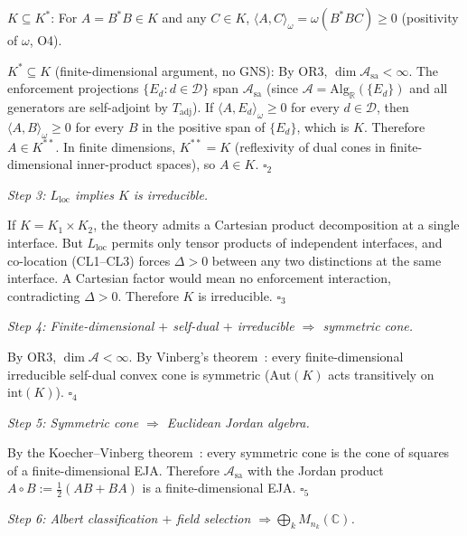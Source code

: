 \documentclass[11pt]{article}
\theoremstyle{remark}
\begin{document}
\begin{tcolorbox}[apfbox, title={Proposition T1-NB (Non-Boolean Bridge): $L_\Delta + L_{\mathrm{loc}} + \mathrm{OR1} + \mathrm{OR2} + \mathrm{OR3} \Rightarrow \mathcal{A} \cong \bigoplus_k M_{n_k}(\mathbb{C})$}]
$K \subseteq K^*$: For $A = B^*B \in K$ and any $C \in K$, $\langle A, C\rangle_\omega = \omega(B^*BC) \ge 0$ (positivity of $\omega$, O4).

$K^* \subseteq K$ (finite-dimensional argument, no GNS): By OR3, $\dim \mathcal{A}_{\mathrm{sa}} < \infty$.  The enforcement projections $\{E_d : d \in \mathcal{D}\}$ span $\mathcal{A}_{\mathrm{sa}}$ (since $\mathcal{A} = \mathrm{Alg}_\mathbb{R}(\{E_d\})$ and all generators are self-adjoint by $T_{\mathrm{adj}}$).  If $\langle A, E_d \rangle_\omega \ge 0$ for every $d \in \mathcal{D}$, then $\langle A, B \rangle_\omega \ge 0$ for every $B$ in the positive span of $\{E_d\}$, which is $K$.  Therefore $A \in K^{**}$.  In finite dimensions, $K^{**} = K$ (reflexivity of dual cones in finite-dimensional inner-product spaces), so $A \in K$.  \hfill$\square_2$

\textit{Step 3: $L_{\mathrm{loc}}$ implies $K$ is irreducible.}

If $K = K_1 \times K_2$, the theory admits a Cartesian product decomposition at a single interface.  But $L_{\mathrm{loc}}$ permits only tensor products of independent interfaces, and co-location (CL1--CL3) forces $\Delta > 0$ between any two distinctions at the same interface.  A Cartesian factor would mean no enforcement interaction, contradicting $\Delta > 0$.  Therefore $K$ is irreducible.  \hfill$\square_3$

\textit{Step 4: Finite-dimensional $+$ self-dual $+$ irreducible $\Rightarrow$ symmetric cone.}

By OR3, $\dim \mathcal{A} < \infty$.  By Vinberg's theorem~\cite{KoecherVinberg}: every finite-dimensional irreducible self-dual convex cone is symmetric ($\mathrm{Aut}(K)$ acts transitively on $\mathrm{int}(K)$).  \hfill$\square_4$

\textit{Step 5: Symmetric cone $\Rightarrow$ Euclidean Jordan algebra.}

By the Koecher--Vinberg theorem~\cite{KoecherVinberg}: every symmetric cone is the cone of squares of a finite-dimensional EJA.  Therefore $\mathcal{A}_{\mathrm{sa}}$ with the Jordan product $A \circ B := \tfrac{1}{2}(AB + BA)$ is a finite-dimensional EJA.  \hfill$\square_5$

\textit{Step 6: Albert classification $+$ field selection $\Rightarrow \bigoplus_k M_{n_k}(\mathbb{C})$.}


\end{tcolorbox}
\end{document}
